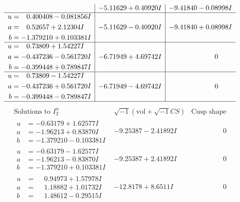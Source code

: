 \documentclass[1p]{elsarticle_modified}
\theoremstyle{definition}
\newcommand{\I}{\sqrt{-1}}
\begin{document}
$$\begin{array}{c|c|c}
 & -5.11629 + 0.40920 I & -9.41840 - 0.08998 I \\ \hline\begin{aligned}
u &= \phantom{-}0.400408 - 0.081856 I \\
a &= \phantom{-}0.52657 + 2.12304 I \\
b &= -1.379210 + 0.103381 I\end{aligned}
 & -5.11629 - 0.40920 I & -9.41840 + 0.08998 I \\ \hline\begin{aligned}
u &= \phantom{-}0.73809 + 1.54227 I \\
a &= -0.437236 - 0.561720 I \\
b &= -0.399448 + 0.789847 I\end{aligned}
 & -6.71949 + 4.69742 I & \phantom{-0.000000 } 0 \\ \hline\begin{aligned}
u &= \phantom{-}0.73809 - 1.54227 I \\
a &= -0.437236 + 0.561720 I \\
b &= -0.399448 - 0.789847 I\end{aligned}
 & -6.71949 - 4.69742 I & \phantom{-0.000000 } 0\\
 \hline 
 \end{array}$$\newpage$$\begin{array}{c|c|c}  
\text{Solutions to }I^u_{2}& \I (\text{vol} + \sqrt{-1}CS) & \text{Cusp shape}\\
 \hline 
\begin{aligned}
u &= -0.63179 + 1.62577 I \\
a &= -1.96213 + 0.83870 I \\
b &= -1.379210 - 0.103381 I\end{aligned}
 & -9.25387 - 2.41892 I & \phantom{-0.000000 } 0 \\ \hline\begin{aligned}
u &= -0.63179 - 1.62577 I \\
a &= -1.96213 - 0.83870 I \\
b &= -1.379210 + 0.103381 I\end{aligned}
 & -9.25387 + 2.41892 I & \phantom{-0.000000 } 0 \\ \hline\begin{aligned}
u &= \phantom{-}0.94973 + 1.57978 I \\
a &= \phantom{-}1.18882 + 1.01732 I \\
b &= \phantom{-}1.48612 - 0.29515 I\end{aligned}
 & -12.8178 + 8.6511 I & \phantom{-0.000000 } 0 \\ \hline\begin{aligned}

\end{aligned}
\end{array}$$
\end{document}
